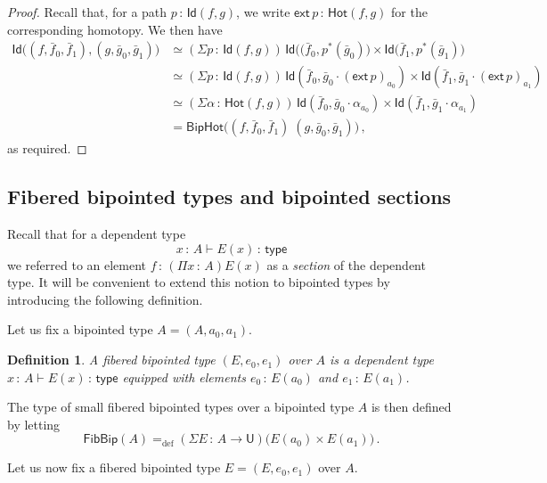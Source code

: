 \documentclass[10pt,a4paper,oneside,reqno]{amsart}
\numberwithin{equation}{section}
\theoremstyle{mythm}
\theoremstyle{mydef}
\newtheorem{definition}[theorem]{Definition}
\theoremstyle{myrmk}
\newcommand{\defeq}{=_{\mathrm{def}}}
\newcommand{\co}{\,{:}\,}
\newcommand{\type}{\mathsf{type}}
\newcommand{\ct}{\cdot}
\newcommand{\Hot}{\mathsf{Hot}}
\newcommand{\ext}{\mathsf{ext}}
\newcommand{\Id}{\mathsf{Id}}
\newcommand{\U}{\mathsf{U}}
\newcommand{\BipHot}{\mathsf{BipHot}}
\newcommand{\FibBip}{\mathsf{FibBip}}
\begin{document}
\begin{proof} Recall that, for a path $p \co \Id( f, g)$, we write $\ext \, p \co \Hot(f, g)$
for the corresponding homotopy. We then have
\begin{align*}
 \Id \big( (f,\bar{f}_0,\bar{f}_1) , (g,\bar{g}_0,\bar{g}_1)  \big)
  &  \simeq (\Sigma p \co \Id( f, g))  \, 
  \Id \big(  (\bar{f}_0, p^*(\bar{g}_0) \big) \times \Id \big( \bar{f}_1,   p^{\ast} (\bar{g}_1) \big) \\
 & \simeq (\Sigma p  \co \Id(f,g))  \, \Id(\bar{f}_0,  \bar{g}_0 \ct (\ext \, p)_{a_0} ) \times \Id( \bar{f}_1, 
 \bar{g}_1\ct (\ext \, p)_{a_1} ) \\
& \simeq (\Sigma \alpha \co \Hot(f, g)) \,  \Id(\bar{f}_0,  \bar{g}_0 \ct \alpha_{a_0} ) \times \Id(\bar{f}_1, \bar{g}_1
\ct \alpha_{a_1} ) \\
& = \BipHot \big( (f,\bar{f}_0,\bar{f}_1) \; (g,\bar{g}_0,\bar{g}_1) \big) \, , 
\end{align*} 
as required.
\end{proof}



\subsection*{Fibered bipointed types and bipointed sections} Recall that for a dependent type
\[
 x \co A \vdash E(x) \co \type
\]
we referred to an element $f \co (\Pi x \co A) E(x)$ as a \emph{section} of the dependent type.
It will be convenient to extend this notion  to bipointed types  by introducing the following definition. 

\medskip

Let us fix a bipointed type $A = (A, a_0, a_1)$. 

\begin{definition} \label{def:fibbipointed}
A \emph{fibered bipointed type} $(E, e_0, e_1)$ over $A$  is a dependent type~$x\co A \vdash E(x) \co \type$ 
equipped  with elements $e_0 \co E(a_0)$ and $e_1 \co E(a_1)$.
\end{definition}

The type of  small fibered bipointed types over a bipointed type $A$ is then defined by letting
\[
\FibBip(A) \defeq (\Sigma E \co A \to \U) \big( E(a_0) \times E(a_1) \big) \, .
 \]
 
 \medskip

Let us now fix a fibered bipointed type $E = (E, e_0, e_1)$  over $A$.
 
 \medskip
 
\end{document}
